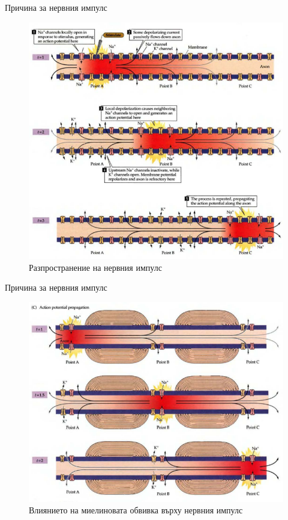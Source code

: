 \begin{frame}[t]{Причина за нервния импулс}
  \begin{figure}[htbp!]
    \centering
    \includegraphics[width=\textwidth,height=0.7\textheight,keepaspectratio]{axon-bare.PNG}
    \caption{Разпространение на нервния импулс \cite[Фиг 3.12]{Neuroscience}}
  \end{figure}
\end{frame}

\begin{frame}[t]{Причина за нервния импулс}
  \begin{figure}[htbp!]
    \centering
    \includegraphics[width=\textwidth,height=0.7\textheight,keepaspectratio]{axon-myelin.PNG}
    \caption{Влиянието на миелиновата обвивка върху нервния импулс \cite[Фиг 3.13]{Neuroscience}}
  \end{figure}
\end{frame}

